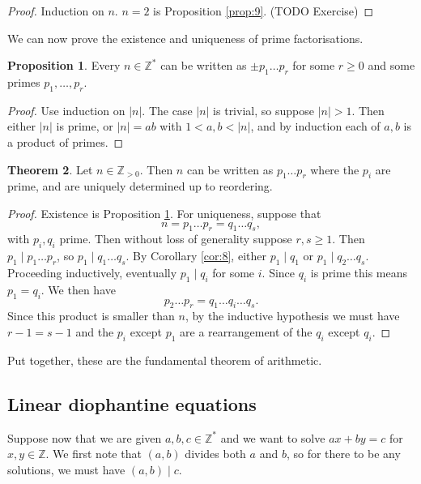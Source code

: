 \documentclass{article}
\newcommand{\Z}{\mathbb{Z}}
\newcommand{\rb}[1]{\left( #1 \right)}
\newcommand{\abs}[1]{\left\lvert #1 \right\rvert}
\theoremstyle{definition}\newtheorem{definition}{Definition}
\theoremstyle{definition}\newtheorem*{remark}{Remark}
\theoremstyle{definition}\newtheorem*{example}{Example}
\theoremstyle{definition}\newtheorem*{note}{Note}
\newtheorem{proposition}[definition]{Proposition}
\newtheorem{theorem}[definition]{Theorem}
\begin{document}
\begin{proof}
Induction on $ n $. $ n = 2 $ is Proposition \ref{prop:9}. (TODO Exercise)
\end{proof}

We can now prove the existence and uniqueness of prime factorisations.

\begin{proposition}
\label{prop:11}
Every $ n \in \Z^* $ can be written as $ \pm p_1 \dots p_r $ for some $ r \ge 0 $ and some primes $ p_1, \dots, p_r $.
\end{proposition}

\begin{proof}
Use induction on $ \abs{n} $. The case $ \abs{n} $ is trivial, so suppose $ \abs{n} > 1 $. Then either $ \abs{n} $ is prime, or $ \abs{n} = ab $ with $ 1 < a, b < \abs{n} $, and by induction each of $ a, b $ is a product of primes.
\end{proof}

\begin{theorem}
Let $ n \in \Z_{> 0} $. Then $ n $ can be written as $ p_1 \dots p_r $ where the $ p_i $ are prime, and are uniquely determined up to reordering.
\end{theorem}

\begin{proof}
Existence is Proposition \ref{prop:11}. For uniqueness, suppose that
$$ n = p_1 \dots p_r = q_1 \dots q_s, $$
with $ p_i, q_i $ prime. Then without loss of generality suppose $ r, s \ge 1 $. Then $ p_1 \mid p_1 \dots p_r $, so $ p_1 \mid q_1 \dots q_s $. By Corollary \ref{cor:8}, either $ p_1 \mid q_1 $ or $ p_1 \mid q_2 \dots q_s $. Proceeding inductively, eventually $ p_1 \mid q_i $ for some $ i $. Since $ q_i $ is prime this means $ p_1 = q_i $. We then have
$$ p_2 \dots p_r = q_1 \dots q_i \dots q_s. $$
Since this product is smaller than $ n $, by the inductive hypothesis we must have $ r - 1 = s - 1 $ and the $ p_i $ except $ p_1 $ are a rearrangement of the $ q_i $ except $ q_i $.
\end{proof}

Put together, these are the fundamental theorem of arithmetic.

\subsection{Linear diophantine equations}

Suppose now that we are given $ a, b, c \in \Z^* $ and we want to solve $ ax + by = c $ for $ x, y \in \Z $. We first note that $ \rb{a, b} $ divides both $ a $ and $ b $, so for there to be any solutions, we must have $ \rb{a, b} \mid c $.
\end{document}
